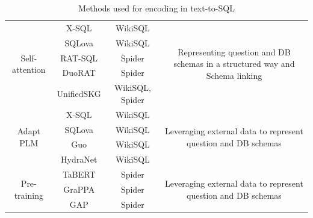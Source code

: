 \begin{table}
\begin{tabular}{|c|c|c|c|}
        \hline
        \multirow{5}{*}{Self-attention} & X-SQL               & WikiSQL                   & \multirow{5}{*}{\parbox{5cm}{Representing question and DB schemas in a structured way and Schema linking}} \\
                                        & SQLova              & WikiSQL                   &                                                                                                            \\
                                        & RAT-SQL             & Spider                    &                                                                                                            \\
                                        & DuoRAT              & Spider                    &                                                                                                            \\
                                        & UnifiedSKG          & WikiSQL, Spider           &                                                                                                            \\
        \hline
        \multirow{4}{*}{Adapt PLM}      & X-SQL               & WikiSQL                   & \multirow{4}{*}{\parbox{5cm}{Leveraging external data to represent question and DB schemas}}               \\
                                        & SQLova              & WikiSQL                   &                                                                                                            \\
                                        & Guo                 & WikiSQL                   &                                                                                                            \\
                                        & HydraNet            & WikiSQL                   &                                                                                                            \\
        \hline
        \multirow{3}{*}{Pre-training}   & TaBERT              & Spider                    & \multirow{3}{*}{\parbox{5cm}{Leveraging external data to represent question and DB schemas}}               \\
                                        & GraPPA              & Spider                    &                                                                                                            \\
                                        & GAP                 & Spider                    &                                                                                                            \\
        \hline
    \end{tabular}
    \caption{Methods used for encoding in text-to-SQL \cite{deng2022recent}}
    \label{tab:methods}
\end{table}







